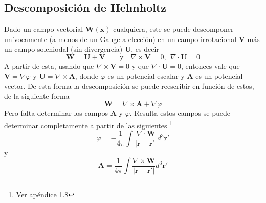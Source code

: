 \subsection{Descomposición de Helmholtz}
Dado un campo vectorial $\textbf{W}(\textbf{x})$ cualquiera, este se puede descomponer unívocamente (a menos de un Gauge a elección) en un campo irrotacional $\textbf{V}$ más un campo soleniodal (sin divergencia) $\textbf{U}$, es decir
\begin{equation*}
    \textbf{W} = \textbf{U} + \textbf{V}
    \quad
    \quad
    \mbox{y}
    \quad
    \nabla \times \textbf{V} = 0,\ \ \nabla \cdot \textbf{U} = 0
\end{equation*}
A partir de esta, usando que $\nabla \times \textbf{V} = 0$ y que $\nabla \cdot \textbf{U} =0$, entonces vale que $\textbf{V} = \nabla \varphi$ y $\textbf{U} = \nabla \times \textbf{A}$, donde $\varphi$ es un potencial escalar y $\textbf{A}$ es un potencial vector. De esta forma la descomposición se puede reescribir en función de estos, de la siguiente forma
\begin{equation*}
    \textbf{W} = \nabla \times \textbf{A} + \nabla \varphi
\end{equation*}
Pero falta determinar los campos $\textbf{A}$ y $\varphi$. Resulta estos campos se puede determinar completamente a partir de las siguientes \footnote{Ver apéndice 1.8}
\begin{equation*}
    \varphi 
    = -\frac{1}{4\pi}\int 
    \frac{\nabla \cdot \textbf{W}}{|\textbf{r} - \textbf{r}'|}d^{3}\textbf{r}'
\end{equation*}
y 
\begin{equation*}
    \textbf{A} 
    = \frac{1}{4\pi}\int 
    \frac{\nabla \times \textbf{W}}{|\textbf{r} - \textbf{r}'|}d^{3}\textbf{r}'
\end{equation*}




